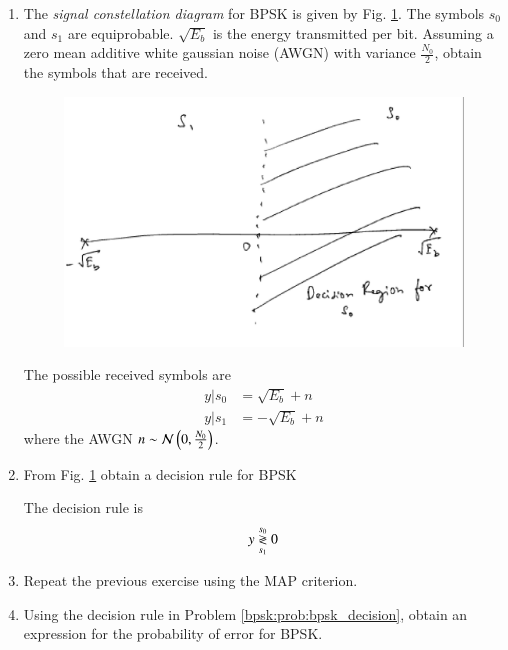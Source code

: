 \renewcommand{\theequation}{\theenumi}
\begin{enumerate}[label=\arabic*.,ref=\thesubsection.\theenumi]
\item
The {\em signal constellation diagram} for BPSK is given by Fig. \ref{bpsk:fig:bpsk_const}.  The symbols $s_0$ and $s_1$ are equiprobable.  $\sqrt{E_b}$ is the energy transmitted per bit. Assuming a zero mean additive white gaussian noise (AWGN) with variance $\frac{N_0}{2}$,
obtain the symbols that are received.

%
\begin{figure}[!h]
\centering
\includegraphics[width=\columnwidth]{./modulation/manual/figs/bpsk_const.eps}
\caption{}
\label{bpsk:fig:bpsk_const}
\end{figure}
\solution The possible received symbols are
\begin{align}
y|s_0 &= \sqrt{E_b} + n
\\
y|s_1 &= -\sqrt{E_b} + n
\end{align}
%
where the AWGN $n \sim \mathcal{N}\left(0,\frac{N_0}{2}\right)$.
%
\item
\label{bpsk:prob:bpsk_decision}
From Fig. \ref{bpsk:fig:bpsk_const} obtain a decision rule for BPSK

\solution The decision rule is
\begin{equation}
y \overset{s_0}{\underset{s_1}{\gtrless}} 0
\end{equation}
\item
Repeat the previous exercise using the MAP criterion.

\item
Using the decision rule in Problem \ref{bpsk:prob:bpsk_decision}, obtain an expression for the probability of error for BPSK.


\end{enumerate}
